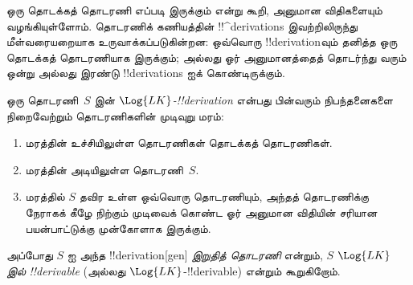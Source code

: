 \documentclass[../../../include/open-logic-section]{subfiles}
\begin{document}
      {}
      {}


\begin{explain}
ஒரு தொடக்கத் தொடரணி எப்படி இருக்கும் என்று கூறி, அனுமான விதிகளையும்
வழங்கியுள்ளோம். தொடரணிக் கணியத்தின் !!^{derivation}s இவற்றிலிருந்து
மீள்வரையறையாக உருவாக்கப்படுகின்றன: ஒவ்வொரு !!{derivation}வும் தனித்த ஒரு
தொடக்கத் தொடரணியாக இருக்கும்; அல்லது ஓர் அனுமானத்தைத் தொடர்ந்து வரும் ஒன்று
அல்லது இரண்டு !!{derivation}s ஐக் கொண்டிருக்கும்.
\end{explain}

\begin{defn}
ஒரு தொடரணி~$S$ இன் \emph{$\Log{LK}$-!!{derivation}} என்பது பின்வரும்
நிபந்தனைகளை நிறைவேற்றும் தொடரணிகளின் முடிவுறு மரம்:
\begin{enumerate}
\item மரத்தின் உச்சியிலுள்ள தொடரணிகள் தொடக்கத் தொடரணிகள்.
\item மரத்தின் அடியிலுள்ள தொடரணி~$S$.
\item மரத்தில் $S$ தவிர உள்ள ஒவ்வொரு தொடரணியும், அந்தத் தொடரணிக்கு நேராகக்
  கீழே நிற்கும் முடிவைக் கொண்ட ஓர் அனுமான விதியின் சரியான பயன்பாட்டுக்கு
  முன்கோளாக இருக்கும்.
\end{enumerate}
அப்போது $S$ ஐ அந்த !!{derivation}[gen] \emph{இறுதித் தொடரணி} என்றும், $S$
\emph{$\Log{LK}$ இல் !!{derivable}} (அல்லது $\Log{LK}$-!!{derivable}) என்றும்
கூறுகிறோம்.
\end{defn}
\end{document}
